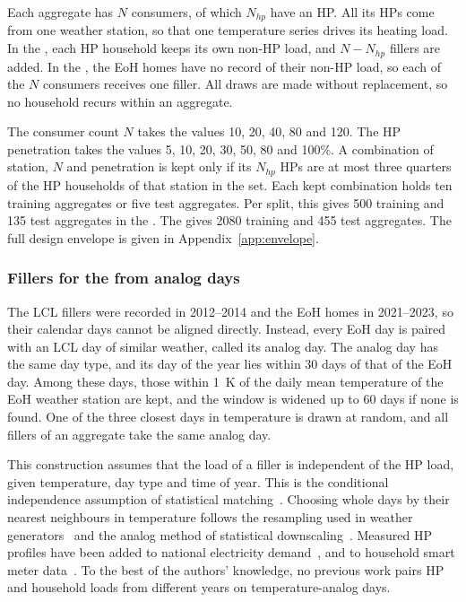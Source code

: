 Each aggregate has $N$ consumers, of which $N_{hp}$ have an HP. All its HPs come from one weather station, so that one temperature series drives its heating load. In the \dataCH, each HP household keeps its own non-HP load, and $N-N_{hp}$ fillers are added. In the \dataGB, the EoH homes have no record of their non-HP load, so each of the $N$ consumers receives one filler. All draws are made without replacement, so no household recurs within an aggregate.

The consumer count $N$ takes the values 10, 20, 40, 80 and 120. The HP penetration takes the values 5, 10, 20, 30, 50, 80 and 100\%. A combination of station, $N$ and penetration is kept only if its $N_{hp}$ HPs are at most three quarters of the HP households of that station in the set. Each kept combination holds ten training aggregates or five test aggregates. Per split, this gives 500 training and 135 test aggregates in the \dataCH. The \dataGB{} gives \num{2080} training and 455 test aggregates. The full design envelope is given in Appendix~\ref{app:envelope}.

\subsubsection{Fillers for the \dataGB{} from analog days}
\label{sec:analog}
The LCL fillers were recorded in 2012--2014 and the EoH homes in 2021--2023, so their calendar days cannot be aligned directly. Instead, every EoH day is paired with an LCL day of similar weather, called its analog day. The analog day has the same day type, and its day of the year lies within 30 days of that of the EoH day. Among these days, those within 1~K of the daily mean temperature of the EoH weather station are kept, and the window is widened up to 60 days if none is found. One of the three closest days in temperature is drawn at random, and all fillers of an aggregate take the same analog day.

This construction assumes that the load of a filler is independent of the HP load, given temperature, day type and time of year. This is the conditional independence assumption of statistical matching~\cite{dorazio2006statistical}. Choosing whole days by their nearest neighbours in temperature follows the resampling used in weather generators~\cite{lall1996nearest,rajagopalan1999knn} and the analog method of statistical downscaling~\cite{zorita1999analog}. Measured HP profiles have been added to national electricity demand~\cite{love2017addition}, and to household smart meter data~\cite{agrawal2026electricity}. To the best of the authors' knowledge, no previous work pairs HP and household loads from different years on temperature-analog days.

